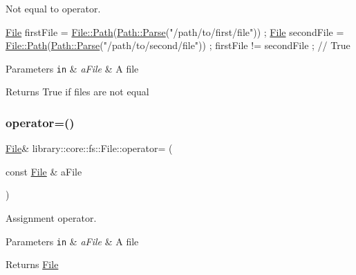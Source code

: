 Not equal to operator. 


\begin{DoxyCode}
\hyperlink{classlibrary_1_1core_1_1fs_1_1_file_a7490060f19a21d4ee58bb6cec87a1ca6}{File} firstFile = \hyperlink{classlibrary_1_1core_1_1fs_1_1_file_a0e0d8a8becb3cdd21775554e181452d8}{File::Path}(\hyperlink{classlibrary_1_1core_1_1fs_1_1_path_aebf5bd3af83e0b7376616e146f3e55df}{Path::Parse}(\textcolor{stringliteral}{"/path/to/first/file"})) ;
\hyperlink{classlibrary_1_1core_1_1fs_1_1_file_a7490060f19a21d4ee58bb6cec87a1ca6}{File} secondFile = \hyperlink{classlibrary_1_1core_1_1fs_1_1_file_a0e0d8a8becb3cdd21775554e181452d8}{File::Path}(\hyperlink{classlibrary_1_1core_1_1fs_1_1_path_aebf5bd3af83e0b7376616e146f3e55df}{Path::Parse}(\textcolor{stringliteral}{"/path/to/second/file"})) ;
firstFile != secondFile ; \textcolor{comment}{// True}
\end{DoxyCode}



\begin{DoxyParams}[1]{Parameters}
\mbox{\tt in}  & {\em a\+File} & A file \\
\hline
\end{DoxyParams}
\begin{DoxyReturn}{Returns}
True if files are not equal 
\end{DoxyReturn}
\mbox{\label{classlibrary_1_1core_1_1fs_1_1_file_a2bea020568e39a80c69be787418c28ba}} 
\subsubsection{\texorpdfstring{operator=()}{operator=()}}
{\footnotesize\ttfamily \hyperlink{classlibrary_1_1core_1_1fs_1_1_file}{File}\& library\+::core\+::fs\+::\+File\+::operator= (\begin{DoxyParamCaption}\item[{const \hyperlink{classlibrary_1_1core_1_1fs_1_1_file}{File} \&}]{a\+File }\end{DoxyParamCaption})}



Assignment operator. 


\begin{DoxyParams}[1]{Parameters}
\mbox{\tt in}  & {\em a\+File} & A file \\
\hline
\end{DoxyParams}
\begin{DoxyReturn}{Returns}
\hyperlink{classlibrary_1_1core_1_1fs_1_1_file}{File} 
\end{DoxyReturn}
\mbox{\label{classlibrary_1_1core_1_1fs_1_1_file_a44ab79a23c5a129be298a026dbeec62f}} 
